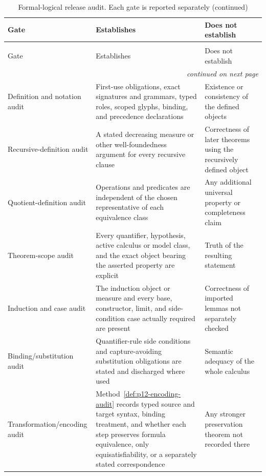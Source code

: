 \begin{landscape}
\thispagestyle{plain}
\begingroup\small
\begin{longtable}{@{}p{1.40in}p{2.35in}p{3.35in}@{}}
\caption{Formal-logical release audit.  Each gate is reported separately.}
\label{tab:p12-release-audit}\\
\toprule
Gate & Establishes & Does not establish \\ \midrule
\endfirsthead
\caption[]{Formal-logical release audit.  Each gate is reported separately (continued)}\\
\toprule
Gate & Establishes & Does not establish \\ \midrule
\endhead
\midrule\multicolumn{3}{r}{\emph{continued on next page}}\\
\endfoot
\endlastfoot
Definition and notation audit & First-use obligations, exact signatures and
grammars, typed roles, scoped glyphs, binding, and precedence declarations &
Existence or consistency of the defined objects \\ \addlinespace
Recursive-definition audit & A stated decreasing measure or other
well-foundedness argument for every recursive clause & Correctness of later
theorems using the recursively defined object \\ \addlinespace
Quotient-definition audit & Operations and predicates are independent of the
chosen representative of each equivalence class & Any additional universal
property or completeness claim \\ \addlinespace
Theorem-scope audit & Every quantifier, hypothesis, active calculus or model
class, and the exact object bearing the asserted property are explicit & Truth
of the resulting statement \\ \addlinespace
Induction and case audit & The induction object or measure and every base,
constructor, limit, and side-condition case actually required are present &
Correctness of imported lemmas not separately checked \\ \addlinespace
Binding/substitution audit & Quantifier-rule side conditions and
capture-avoiding substitution obligations are stated and discharged where
used & Semantic adequacy of the whole calculus \\ \addlinespace
Transformation/encoding audit & Method~\ref{def:p12-encoding-audit} records
typed source and target syntax, binding treatment, and whether each step
preserves formula equivalence, only equisatisfiability, or a separately stated
correspondence & Any stronger preservation theorem not recorded there \\

\end{longtable}
\end{landscape}
